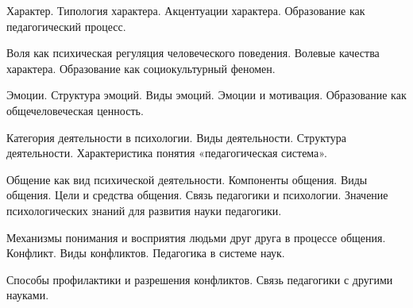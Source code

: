 \documentclass[
	14pt,
	a4paper,
	]
	{scrartcl}
\begin{document}
\newpage


\shapk
{}
\setcounter{zad}{0}

\vfill
\z 	Характер. Типология характера. Акцентуации характера.
 \vfill
\z 	Образование как педагогический процесс.
 \vfill

\vfill

\newpage


\shapk
{}
\setcounter{zad}{0}

\vfill
\z 	Воля как психическая регуляция человеческого поведения. Волевые качества характера.
 \vfill
\z 	Образование как социокультурный феномен.
 \vfill

\vfill

\newpage


\shapk
{}
\setcounter{zad}{0}

\vfill
\z 	Эмоции. Структура эмоций. Виды эмоций. Эмоции и мотивация.
 \vfill
\z 	Образование как общечеловеческая ценность.
 \vfill

\vfill

\newpage


\shapk
{}
\setcounter{zad}{0}

\vfill
\z 	Категория деятельности в психологии. Виды деятельности. Структура деятельности.
 \vfill
\z 	Характеристика понятия «педагогическая система».
 \vfill

\vfill

\newpage


\shapk
{}
\setcounter{zad}{0}

\vfill
\z 	Общение как вид психической деятельности. Компоненты общения. Виды общения. Цели и средства общения.
 \vfill
\z 	Связь педагогики и психологии. Значение психологических знаний для развития науки педагогики.
 \vfill

\vfill

\newpage


\shapk
{}
\setcounter{zad}{0}

\vfill
\z 	Механизмы понимания и восприятия людьми друг друга в процессе общения.	Конфликт. Виды конфликтов.
 \vfill
\z 	Педагогика в системе наук.
 \vfill

\vfill

\newpage


\shapk
{}
\setcounter{zad}{0}

\vfill
\z 	Способы профилактики и разрешения конфликтов.
 \vfill
\z 	Связь педагогики с другими науками.
 \vfill
\end{document}
